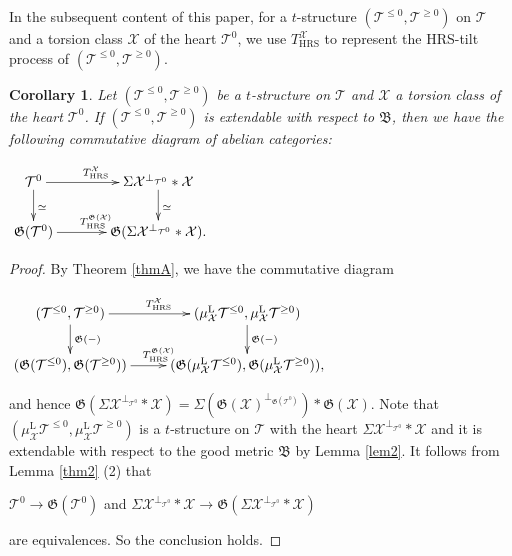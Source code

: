 \documentclass[11pt,a4paper]{amsart}
\numberwithin{equation}{section} \theoremstyle{plain}
\newtheorem{cor}[lem]{Corollary}
\numberwithin{equation}{section} \theoremstyle{definition}
\begin{document}
In the subsequent content of this paper, for a $t$-structure $(\mathcal{T}^{\leq0},\mathcal{T}^{\geq0})$ on $\mathcal{T}$ and a torsion class $\mathcal{X}$ of the heart $\mathcal{T}^{0}$, we use $T_{\mathrm{HRS}}^{\mathcal{X}}$ to represent the HRS-tilt process of $(\mathcal{T}^{\leq0},\mathcal{T}^{\geq0})$.


\begin{cor}\label{cor0}  Let $(\mathcal{T}^{\leq0},\mathcal{T}^{\geq0})$ be a $t$-structure on $\mathcal{T}$ and $\mathcal{X}$ a torsion class of the heart $\mathcal{T}^{0}$. If $(\mathcal{T}^{\leq0},\mathcal{T}^{\geq0})$ is extendable with respect to $\mathfrak{B}$, then we have the following commutative diagram of abelian categories:
\begin{center} $\xymatrix@C=35pt@R=20pt{
\mathcal{T}^{0}\ar[d]^{\simeq}\ar[r]^{T_{\mathrm{HRS}}^{\mathcal{X}}} &\Sigma\mathcal{X}^{\perp_{\mathcal{T}^{0}}}*\mathcal{X}\ar[d]^{\simeq}&\\
\mathfrak{G}(\mathcal{T}^{0})\ar[r]^{T_{\mathrm{HRS}}^{\mathfrak{G}(\mathcal{X})}}& \mathfrak{G}(\Sigma\mathcal{X}^{\perp_{\mathcal{T}^{0}}}*\mathcal{X}).&}$
\end{center}
\end{cor}
\begin{proof} By Theorem \ref{thmA}, we have the commutative diagram
\begin{center} $\xymatrix@C=25pt@R=20pt{
(\mathcal{T}^{\leq0},\mathcal{T}^{\geq0})\ar[d]^{\mathfrak{G}(-)}\ar[r]^{T_{\mathrm{HRS}}^{\mathcal{X}}} &(\mu^{\mathrm{L}}_{\mathcal{X}}\mathcal{T}^{\leq0},\mu^{\mathrm{L}}_{\mathcal{X}}\mathcal{T}^{\geq0})\ar[d]^{\mathfrak{G}(-)}&\\
(\mathfrak{G}(\mathcal{T}^{\leq0}),\mathfrak{G}(\mathcal{T}^{\geq0}))\ar[r]^{T_{\mathrm{HRS}}^{\mathfrak{G}(\mathcal{X})}}& (\mathfrak{G}(\mu^{\mathrm{L}}_{\mathcal{X}}\mathcal{T}^{\leq0}),\mathfrak{G}(\mu^{\mathrm{L}}_{\mathcal{X}}\mathcal{T}^{\geq0})),&}$
\end{center}and hence $\mathfrak{G}(\Sigma\mathcal{X}^{\perp_{\mathcal{T}^{0}}}*\mathcal{X})=\Sigma(\mathfrak{G}(\mathcal{X})^{\perp_{\mathfrak{G}(\mathcal{T}^{0})}})\ast\mathfrak{G}(\mathcal{X})$. Note that $(\mu^{\mathrm{L}}_{\mathcal{X}}\mathcal{T}^{\leq0},\mu^{\mathrm{L}}_{\mathcal{X}}\mathcal{T}^{\geq0})$ is a $t$-structure on $\mathcal{T}$ with the heart $\Sigma\mathcal{X}^{\perp_{\mathcal{T}^{0}}}*\mathcal{X}$ and it is extendable with respect to the good metric $\mathfrak{B}$ by Lemma \ref{lem2}. It follows from Lemma \ref{thm2} (2) that
\begin{center}
$\mathcal{T}^{0}\rightarrow\mathfrak{G}(\mathcal{T}^{0})$ and $\Sigma\mathcal{X}^{\perp_{\mathcal{T}^{0}}}*\mathcal{X}\rightarrow\mathfrak{G}(\Sigma\mathcal{X}^{\perp_{\mathcal{T}^{0}}}*\mathcal{X})$
\end{center}
 are equivalences. So the conclusion holds.
\end{proof}
\end{document}
